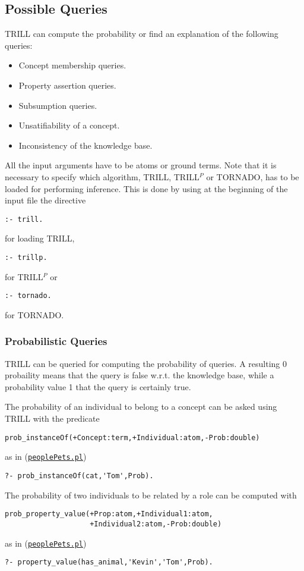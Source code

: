 \subsection{Possible Queries}
\label{queries}

TRILL can compute the probability or find an explanation of the following queries:
\begin{itemize}
  \item Concept membership queries.
  \item Property assertion queries.
  \item Subsumption queries.
  \item Unsatifiability of a concept.
  \item Inconsistency of the knowledge base.
\end{itemize}
All the input arguments have to be atoms or ground terms.
Note that it is necessary to specify which algorithm, TRILL, TRILL$^P$ or TORNADO, has to be loaded for performing inference. This is done by using at the beginning of the input file the directive
\begin{verbatim}
:- trill.
\end{verbatim}
for loading TRILL,
\begin{verbatim}
:- trillp.
\end{verbatim}
for TRILL$^P$ or
\begin{verbatim}
:- tornado.
\end{verbatim}
for TORNADO.

\subsubsection{Probabilistic Queries}
TRILL can be queried for computing the probability of queries. A resulting 0 probaility means that the query is false w.r.t. the knowledge base, while a probability value 1 that the query is certainly true.

The probability of an individual to belong to a concept can be asked using TRILL with the predicate
\begin{verbatim}
prob_instanceOf(+Concept:term,+Individual:atom,-Prob:double)
\end{verbatim}
as in (\href{http://trill.lamping.unife.it/example/trill/peoplePets.pl}{\texttt{peoplePets.pl}})
\begin{verbatim}
?- prob_instanceOf(cat,'Tom',Prob).
\end{verbatim}

The probability of two individuals to be related by a role can be computed with
\begin{verbatim}
prob_property_value(+Prop:atom,+Individual1:atom,
                    +Individual2:atom,-Prob:double)
\end{verbatim}
as in (\href{http://trill.lamping.unife.it/example/trill/peoplePets.pl}{\texttt{peoplePets.pl}})
\begin{verbatim}
?- property_value(has_animal,'Kevin','Tom',Prob).
\end{verbatim}

